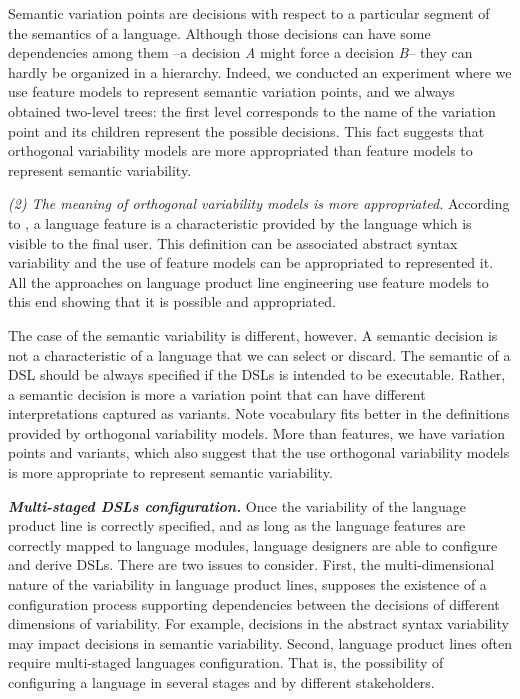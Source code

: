 Semantic variation points are decisions with respect to a particular segment of the semantics of a language. Although those decisions can have some dependencies among them --a decision \textit{A} might force a decision \textit{B}-- they can hardly be organized in a hierarchy. Indeed, we conducted an experiment where we use feature models to represent semantic variation points, and we always obtained two-level trees: the first level corresponds to the name of the variation point and its children represent the possible decisions. This fact suggests that orthogonal variability models are more appropriated than feature models to represent semantic variability.  

\vspace{2mm}
\textit{(2) The meaning of orthogonal variability models is more appropriated.} According to \cite{Liebig:2013}, a language feature is a characteristic provided by the language which is visible to the final user. This definition can be associated abstract syntax variability and the use of feature models can be appropriated to represented it. All the approaches on language product line engineering use feature models to this end showing that it is possible and appropriated. 

The case of the semantic variability is different, however. A semantic decision is not a characteristic of a language that we can select or discard. The semantic of a DSL should be always specified if the DSLs is intended to be executable. Rather, a semantic decision is more a variation point that can have different interpretations captured as variants. Note vocabulary fits better in the definitions provided by orthogonal variability models. More than features, we have variation points and variants, which also suggest that the use orthogonal variability models is more appropriate to represent semantic variability.

\vspace{2mm}
\textit{\textbf{Multi-staged DSLs configuration.}} Once the variability of the language product line is correctly specified, and as long as the language features are correctly mapped to language modules, language designers are able to configure and derive DSLs. There are two issues to consider. First, the multi-dimensional nature of the variability in language product lines, supposes the existence of a configuration process supporting dependencies between the decisions of different dimensions of variability. For example, decisions in the abstract syntax variability may impact decisions in semantic variability. Second, language product lines often require multi-staged languages configuration. That is, the possibility of configuring a language in several stages and by different stakeholders.

